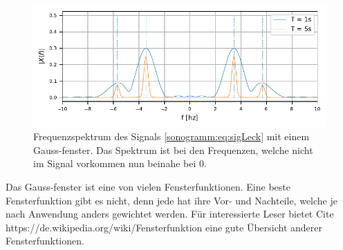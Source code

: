 \begin{figure}
    \centering
    \includegraphics{papers/sonogramm/images/twoHarmGauss.pdf}
    \caption{Frequenzspektrum des Signals \eqref{sonogramm:eq:sigLeck} mit
    einem Gauss-fenster. Das Spektrum ist bei den Frequenzen, welche nicht im Signal vorkommen
    nun beinahe bei 0.
    \label{sonogramm:twoHarmGauss}
    }
\end{figure}

Das Gauss-fenster ist eine von vielen Fensterfunktionen. 
Eine beste Fensterfunktion gibt es nicht, denn jede hat ihre Vor- und Nachteile, welche
je nach Anwendung anders gewichtet werden.
Für interessierte Leser bietet Cite https://de.wikipedia.org/wiki/Fensterfunktion eine 
gute Übersicht anderer Fensterfunktionen.

